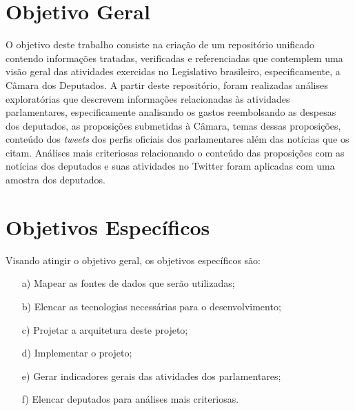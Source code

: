 \section{Objetivo Geral}
O objetivo deste trabalho consiste na criação de um repositório unificado contendo informações tratadas, verificadas e referenciadas que contemplem uma visão geral das atividades exercidas no Legislativo brasileiro, especificamente, a Câmara dos Deputados. A partir deste repositório, foram realizadas análises exploratórias que descrevem informações relacionadas às atividades parlamentares, especificamente analisando os gastos reembolsando as despesas dos deputados, as proposições submetidas à Câmara, temas dessas proposições, conteúdo dos \textit{tweets} dos perfis oficiais dos parlamentares além das notícias que os citam. Análises mais criteriosas relacionando o conteúdo das proposições com as notícias dos deputados e suas atividades no Twitter foram aplicadas com uma amostra dos deputados.

\section{Objetivos Específicos}
Visando atingir o objetivo geral, os objetivos específicos são:
\begin{enumerate} 
 \item [a)] Mapear as fontes de dados que serão utilizadas; 
 \item [b)] Elencar as tecnologias necessárias para o desenvolvimento;
 \item [c)] Projetar a arquitetura deste projeto;
 \item [d)] Implementar o projeto;
 \item [e)] Gerar indicadores gerais das atividades dos parlamentares;
 \item [f)] Elencar deputados para análises mais criteriosas.
\end{enumerate} 
